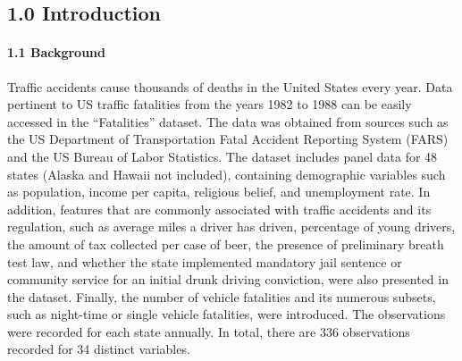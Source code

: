 \documentclass[]{article}
\let\oldparagraph\paragraph
\renewcommand{\paragraph}[1]{\oldparagraph{#1}\mbox{}}
\begin{document}
\hypertarget{introduction}{%
\subsection{1.0 Introduction}\label{introduction}}

\hypertarget{background}{%
\paragraph{1.1 Background}\label{background}}

Traffic accidents cause thousands of deaths in the United States every year. Data pertinent to US traffic fatalities from the years 1982 to 1988 can be easily accessed in the ``Fatalities'' dataset. The data was obtained from sources such as the US Department of Transportation Fatal Accident Reporting System (FARS) and the US Bureau of Labor Statistics. The dataset includes panel data for 48 states (Alaska and Hawaii not included), containing demographic variables such as population, income per capita, religious belief, and unemployment rate. In addition, features that are commonly associated with traffic accidents and its regulation, such as average miles a driver has driven, percentage of young drivers, the amount of tax collected per case of beer, the presence of preliminary breath test law, and whether the state implemented mandatory jail sentence or community service for an initial drunk driving conviction, were also presented in the dataset. Finally, the number of vehicle fatalities and its numerous subsets, such as night-time or single vehicle fatalities, were introduced. The observations were recorded for each state annually. In total, there are 336 observations recorded for 34 distinct variables.
\end{document}

